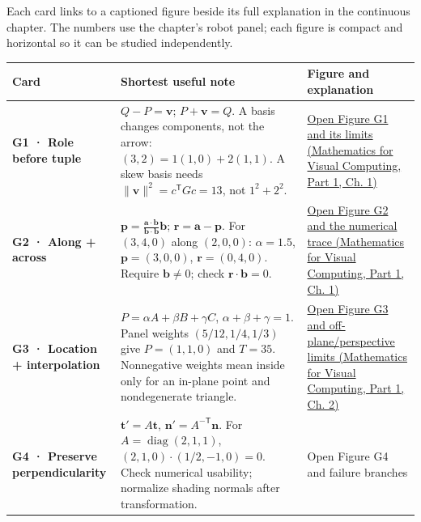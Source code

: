 Each card links to a captioned figure beside its full explanation in the continuous chapter. The numbers use the chapter's robot panel; each figure is compact and horizontal so it can be studied independently.

{\def\LTcaptype{none} %
\begin{longtable}[]{@{}
  >{\raggedright\arraybackslash}p{}
  >{\raggedright\arraybackslash}p{}
  >{\raggedright\arraybackslash}p{}@{}}
\toprule\noalign{}
\begin{minipage}[b]{\linewidth}\raggedright
Card
\end{minipage} & \begin{minipage}[b]{\linewidth}\raggedright
Shortest useful note
\end{minipage} & \begin{minipage}[b]{\linewidth}\raggedright
Figure and explanation
\end{minipage} \\
\midrule\noalign{}
\endhead
\bottomrule\noalign{}
\endlastfoot
\textbf{G1 · Role before tuple} & \(Q-P=\mathbf v\); \(P+\mathbf v=Q\). A basis changes components, not the arrow: \((3,2)=1(1,0)+2(1,1)\). A skew basis needs \(\|\mathbf v\|^2=c^\mathsf TGc=13\), not \(1^2+2^2\). & \href{../02-Mathematics-for-Visual-Computing-P01/main.pdf\#01-foundations-i-ch017-g1---one-movement-two-descriptions}{Open Figure G1 and its limits (Mathematics for Visual Computing, Part 1, Ch. 1)} \\
\textbf{G2 · Along + across} & \(\mathbf p=\frac{\mathbf a\cdot\mathbf b}{\mathbf b\cdot\mathbf b}\mathbf b\); \(\mathbf r=\mathbf a-\mathbf p\). For \((3,4,0)\) along \((2,0,0)\): \(\alpha=1.5\), \(\mathbf p=(3,0,0)\), \(\mathbf r=(0,4,0)\). Require \(\mathbf b\ne0\); check \(\mathbf r\cdot\mathbf b=0\). & \href{../02-Mathematics-for-Visual-Computing-P01/main.pdf\#01-foundations-i-ch017-g2---split-the-request-into-rail-travel-and-sideways-travel}{Open Figure G2 and the numerical trace (Mathematics for Visual Computing, Part 1, Ch. 1)} \\
\textbf{G3 · Location + interpolation} & \(P=\alpha A+\beta B+\gamma C\), \(\alpha+\beta+\gamma=1\). Panel weights \((5/12,1/4,1/3)\) give \(P=(1,1,0)\) and \(T=35\). Nonnegative weights mean inside only for an in-plane point and nondegenerate triangle. & \href{../02-Mathematics-for-Visual-Computing-P01/main.pdf\#01-foundations-i-ch018-g3---reconstruct-a-sensor-location-from-the-corners}{Open Figure G3 and off-plane/perspective limits (Mathematics for Visual Computing, Part 1, Ch. 2)} \\
\textbf{G4 · Preserve perpendicularity} & \(\mathbf t'=A\mathbf t\), \(\mathbf n'=A^{-\mathsf T}\mathbf n\). For \(A=\operatorname{diag}(2,1,1)\), \((2,1,0)\cdot(1/2,-1,0)=0\). Check numerical usability; normalize shading normals after transformation. & {Open Figure G4 and failure branches} \\
\end{longtable}
}

